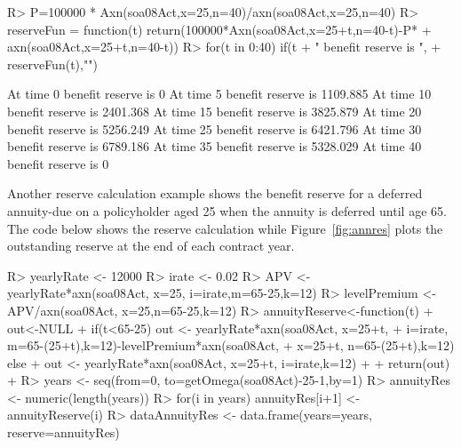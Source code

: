 \documentclass[nojss]{jss}
\begin{document}
\begin{Schunk}
\begin{Sinput}
R> P=100000 * Axn(soa08Act,x=25,n=40)/axn(soa08Act,x=25,n=40)
R> reserveFun = function(t) return(100000*Axn(soa08Act,x=25+t,n=40-t)-P*
+  					axn(soa08Act,x=25+t,n=40-t))
R> for(t in 0:40) {if(t%
+  				" benefit reserve is ", 
+  				reserveFun(t),"\n")}
\end{Sinput}
\begin{Soutput}
At time  0  benefit reserve is  0 
At time  5  benefit reserve is  1109.885 
At time  10  benefit reserve is  2401.368 
At time  15  benefit reserve is  3825.879 
At time  20  benefit reserve is  5256.249 
At time  25  benefit reserve is  6421.796 
At time  30  benefit reserve is  6789.186 
At time  35  benefit reserve is  5328.029 
At time  40  benefit reserve is  0 
\end{Soutput}
\end{Schunk}


Another reserve calculation example shows the benefit reserve for a deferred
annuity-due on a policyholder aged 25 when the annuity is deferred until age 65.
The code below shows the reserve calculation while Figure~\ref{fig:annres} plots
the outstanding reserve at the end of each contract year.

\begin{Schunk}
\begin{Sinput}
R> yearlyRate <- 12000
R> irate <- 0.02
R> APV <- yearlyRate*axn(soa08Act, x=25, i=irate,m=65-25,k=12)
R> levelPremium <- APV/axn(soa08Act, x=25,n=65-25,k=12)
R> annuityReserve<-function(t) {
+  	out<-NULL
+  	if(t<65-25) out <- yearlyRate*axn(soa08Act, x=25+t, 
+      i=irate, m=65-(25+t),k=12)-levelPremium*axn(soa08Act, 
+                x=25+t, n=65-(25+t),k=12) else {
+  		out <- yearlyRate*axn(soa08Act, x=25+t, i=irate,k=12)
+  	}
+  	return(out)
+  }
R> years <- seq(from=0, to=getOmega(soa08Act)-25-1,by=1)
R> annuityRes <- numeric(length(years))
R> for(i in years) annuityRes[i+1] <- annuityReserve(i)
R> dataAnnuityRes <- data.frame(years=years, reserve=annuityRes)
\end{Sinput}
\end{Schunk}
\end{document}
